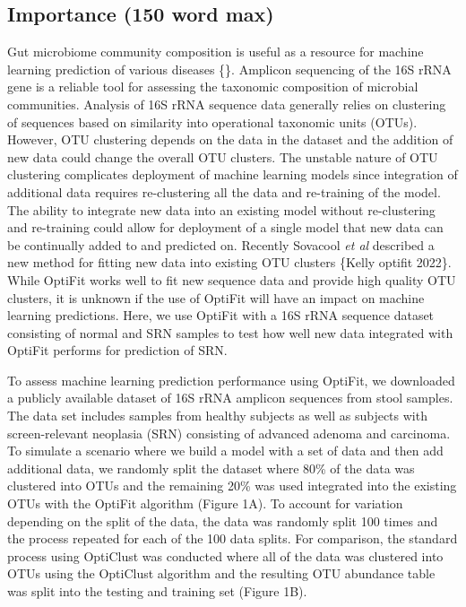 \documentclass[
  11pt,
]{article}
\begin{document}
\hypertarget{importance-150-word-max}{%
\subsection{Importance (150 word max)}\label{importance-150-word-max}}

\newpage

Gut microbiome community composition is useful as a resource for machine
learning prediction of various diseases \{\}. Amplicon sequencing of the
16S rRNA gene is a reliable tool for assessing the taxonomic composition
of microbial communities. Analysis of 16S rRNA sequence data generally
relies on clustering of sequences based on similarity into operational
taxonomic units (OTUs). However, OTU clustering depends on the data in
the dataset and the addition of new data could change the overall OTU
clusters. The unstable nature of OTU clustering complicates deployment
of machine learning models since integration of additional data requires
re-clustering all the data and re-training of the model. The ability to
integrate new data into an existing model without re-clustering and
re-training could allow for deployment of a single model that new data
can be continually added to and predicted on. Recently Sovacool \emph{et
al} described a new method for fitting new data into existing OTU
clusters \{Kelly optifit 2022\}. While OptiFit works well to fit new
sequence data and provide high quality OTU clusters, it is unknown if
the use of OptiFit will have an impact on machine learning predictions.
Here, we use OptiFit with a 16S rRNA sequence dataset consisting of
normal and SRN samples to test how well new data integrated with OptiFit
performs for prediction of SRN.

To assess machine learning prediction performance using OptiFit, we
downloaded a publicly available dataset of 16S rRNA amplicon sequences
from stool samples. The data set includes samples from healthy subjects
as well as subjects with screen-relevant neoplasia (SRN) consisting of
advanced adenoma and carcinoma. To simulate a scenario where we build a
model with a set of data and then add additional data, we randomly split
the dataset where 80\% of the data was clustered into OTUs and the
remaining 20\% was used integrated into the existing OTUs with the
OptiFit algorithm (Figure 1A). To account for variation depending on the
split of the data, the data was randomly split 100 times and the process
repeated for each of the 100 data splits. For comparison, the standard
process using OptiClust was conducted where all of the data was
clustered into OTUs using the OptiClust algorithm and the resulting OTU
abundance table was split into the testing and training set (Figure 1B).
\end{document}
